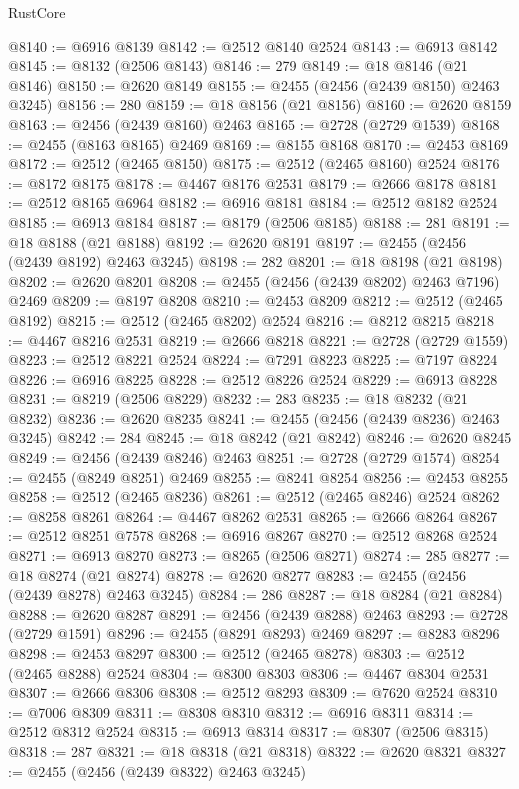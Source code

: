 \begin{lexlean}{RustCore}
\begin{coremodule}
@8140 := @6916 @8139
@8142 := @2512 @8140 @2524
@8143 := @6913 @8142
@8145 := @8132 (@2506 @8143)
@8146 := 279
@8149 := @18 @8146 (@21 @8146)
@8150 := @2620 @8149
@8155 := @2455 (@2456 (@2439 @8150) @2463 @3245)
@8156 := 280
@8159 := @18 @8156 (@21 @8156)
@8160 := @2620 @8159
@8163 := @2456 (@2439 @8160) @2463
@8165 := @2728 (@2729 @1539)
@8168 := @2455 (@8163 @8165) @2469
@8169 := @8155 @8168
@8170 := @2453 @8169
@8172 := @2512 (@2465 @8150)
@8175 := @2512 (@2465 @8160) @2524
@8176 := @8172 @8175
@8178 := @4467 @8176 @2531
@8179 := @2666 @8178
@8181 := @2512 @8165 @6964
@8182 := @6916 @8181
@8184 := @2512 @8182 @2524
@8185 := @6913 @8184
@8187 := @8179 (@2506 @8185)
@8188 := 281
@8191 := @18 @8188 (@21 @8188)
@8192 := @2620 @8191
@8197 := @2455 (@2456 (@2439 @8192) @2463 @3245)
@8198 := 282
@8201 := @18 @8198 (@21 @8198)
@8202 := @2620 @8201
@8208 := @2455 (@2456 (@2439 @8202) @2463 @7196) @2469
@8209 := @8197 @8208
@8210 := @2453 @8209
@8212 := @2512 (@2465 @8192)
@8215 := @2512 (@2465 @8202) @2524
@8216 := @8212 @8215
@8218 := @4467 @8216 @2531
@8219 := @2666 @8218
@8221 := @2728 (@2729 @1559)
@8223 := @2512 @8221 @2524
@8224 := @7291 @8223
@8225 := @7197 @8224
@8226 := @6916 @8225
@8228 := @2512 @8226 @2524
@8229 := @6913 @8228
@8231 := @8219 (@2506 @8229)
@8232 := 283
@8235 := @18 @8232 (@21 @8232)
@8236 := @2620 @8235
@8241 := @2455 (@2456 (@2439 @8236) @2463 @3245)
@8242 := 284
@8245 := @18 @8242 (@21 @8242)
@8246 := @2620 @8245
@8249 := @2456 (@2439 @8246) @2463
@8251 := @2728 (@2729 @1574)
@8254 := @2455 (@8249 @8251) @2469
@8255 := @8241 @8254
@8256 := @2453 @8255
@8258 := @2512 (@2465 @8236)
@8261 := @2512 (@2465 @8246) @2524
@8262 := @8258 @8261
@8264 := @4467 @8262 @2531
@8265 := @2666 @8264
@8267 := @2512 @8251 @7578
@8268 := @6916 @8267
@8270 := @2512 @8268 @2524
@8271 := @6913 @8270
@8273 := @8265 (@2506 @8271)
@8274 := 285
@8277 := @18 @8274 (@21 @8274)
@8278 := @2620 @8277
@8283 := @2455 (@2456 (@2439 @8278) @2463 @3245)
@8284 := 286
@8287 := @18 @8284 (@21 @8284)
@8288 := @2620 @8287
@8291 := @2456 (@2439 @8288) @2463
@8293 := @2728 (@2729 @1591)
@8296 := @2455 (@8291 @8293) @2469
@8297 := @8283 @8296
@8298 := @2453 @8297
@8300 := @2512 (@2465 @8278)
@8303 := @2512 (@2465 @8288) @2524
@8304 := @8300 @8303
@8306 := @4467 @8304 @2531
@8307 := @2666 @8306
@8308 := @2512 @8293
@8309 := @7620 @2524
@8310 := @7006 @8309
@8311 := @8308 @8310
@8312 := @6916 @8311
@8314 := @2512 @8312 @2524
@8315 := @6913 @8314
@8317 := @8307 (@2506 @8315)
@8318 := 287
@8321 := @18 @8318 (@21 @8318)
@8322 := @2620 @8321
@8327 := @2455 (@2456 (@2439 @8322) @2463 @3245)

\end{coremodule}
\end{lexlean}
